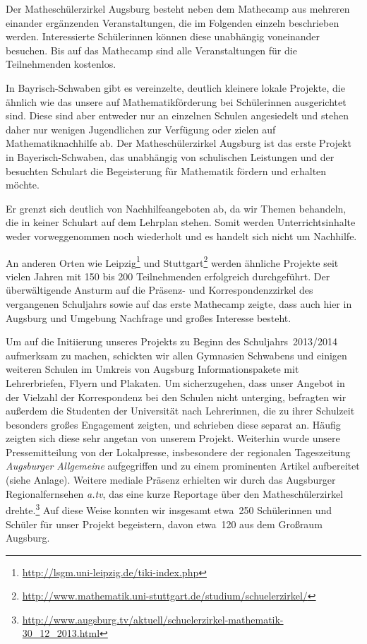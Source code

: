 \documentclass[12pt]{zettel}
\begin{document}
Der Matheschülerzirkel Augsburg besteht neben dem Mathecamp aus mehreren einander ergänzenden Veranstaltungen, die im
Folgenden einzeln beschrieben werden. Interessierte Schülerinnen
können diese unabhängig voneinander besuchen. Bis auf das Mathecamp sind alle
Veranstaltungen für die Teilnehmenden kostenlos.

In Bayrisch-Schwaben gibt es vereinzelte, deutlich kleinere lokale
Projekte, die ähnlich wie das unsere auf Mathematikförderung bei Schülerinnen ausgerichtet sind. Diese sind aber entweder nur an einzelnen Schulen
angesiedelt und stehen daher nur wenigen Jugendlichen zur Verfügung oder zielen
auf Mathematiknachhilfe ab. Der Matheschülerzirkel Augsburg ist das erste
Projekt in Bayerisch-Schwaben, das unabhängig von schulischen Leistungen und der besuchten Schulart die
Begeisterung für Mathematik fördern und erhalten möchte.

Er grenzt sich deutlich von Nachhilfeangeboten ab, da wir Themen behandeln, die in keiner Schulart auf dem Lehrplan stehen. Somit werden Unterrichtsinhalte weder
vorweggenommen noch wiederholt und es handelt sich nicht um Nachhilfe.

An anderen Orten wie Leipzig\footnote{\href{http://lsgm.uni-leipzig.de/tiki-index.php}{\textsf{http:/\!/lsgm.uni-leipzig.de/tiki-index.php}}} und
Stuttgart\footnote{\href{http://www.mathematik.uni-stuttgart.de/studium/schuelerzirkel/}{\textsf{http:/\!/www.mathematik.uni-stuttgart.de/studium/schuelerzirkel/}}}
werden ähnliche Projekte seit
vielen Jahren mit 150 bis 200 Teilnehmenden erfolgreich durchgeführt. Der überwältigende Ansturm auf die Präsenz- und Korrespondenzzirkel des vergangenen Schuljahrs sowie auf das
erste Mathecamp zeigte, dass auch hier in Augsburg und Umgebung Nachfrage und großes Interesse besteht.

Um auf die Initiierung unseres Projekts zu Beginn des Schuljahrs~2013/2014
aufmerksam zu machen, schickten wir allen Gymnasien Schwabens und einigen
weiteren Schulen im Umkreis von Augsburg Informationspakete mit Lehrerbriefen,
Flyern und Plakaten. Um sicherzugehen, dass unser Angebot in der
Vielzahl der Korrespondenz bei den Schulen nicht unterging, befragten wir außerdem
die Studenten der Universität nach Lehrerinnen, die zu ihrer Schulzeit
besonders großes Engagement zeigten, und schrieben diese separat an.
Häufig zeigten sich diese sehr angetan von unserem Projekt.
Weiterhin wurde unsere Pressemitteilung von der Lokalpresse, insbesondere der regionalen Tageszeitung
\emph{Augsburger Allgemeine} aufgegriffen und zu einem prominenten Artikel aufbereitet (siehe Anlage). Weitere mediale Präsenz erhielten wir durch das Augsburger
Regionalfernsehen \emph{a.tv}, das eine kurze Reportage über den Matheschülerzirkel drehte.\footnote{\href{http://www.augsburg.tv/aktuell/schuelerzirkel-mathematik-30_12_2013.html}{\textsf{http:/\!/www.augsburg.tv/aktuell/schuelerzirkel-mathematik-30\_{}12\_{}2013.html}}} Auf diese Weise konnten wir insgesamt etwa~250 Schülerinnen und Schüler für
unser Projekt begeistern, davon etwa~120 aus dem Großraum Augsburg.
\end{document}
